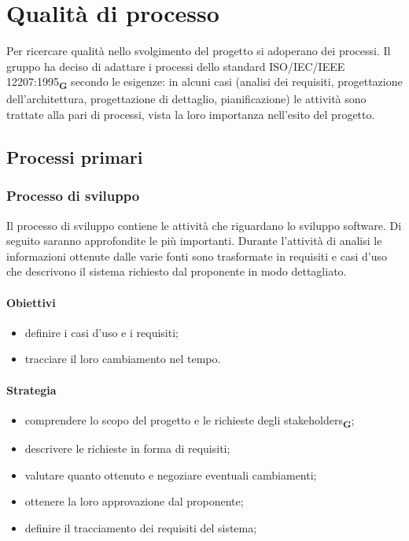 \section{Qualità di processo}
Per ricercare qualità nello svolgimento del progetto si adoperano dei processi.
Il gruppo ha deciso di adattare i processi dello standard ISO/IEC/IEEE 12207:1995\textsubscript{\textbf{G}} secondo le esigenze: in alcuni casi (analisi dei requisiti,
progettazione dell’architettura, progettazione di dettaglio, pianificazione) le attività sono trattate
alla pari di processi, vista la loro importanza nell’esito del progetto.
\subsection{Processi primari}
\subsubsection{Processo di sviluppo}
Il processo di sviluppo contiene le attività che riguardano lo sviluppo software. Di seguito saranno approfondite le più importanti.
Durante l'attività di analisi le informazioni ottenute dalle varie fonti sono trasformate in requisiti e casi d'uso che descrivono il sistema richiesto
dal proponente in modo dettagliato.
\paragraph{Obiettivi}
\begin{itemize}
    \item definire i casi d'uso e i requisiti;
    \item tracciare il loro cambiamento nel tempo.
\end{itemize}
\paragraph{Strategia}
\begin{itemize}
    \item comprendere lo scopo del progetto e le richieste degli stakeholders\textsubscript{\textbf{G}};
    \item descrivere le richieste in forma di requisiti;
    \item valutare quanto ottenuto e negoziare eventuali cambiamenti;
    \item ottenere la loro approvazione dal proponente;
    \item definire il tracciamento dei requisiti del sistema;
\end{itemize}
